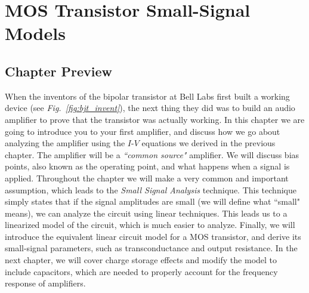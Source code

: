 \chapter{MOS Transistor Small-Signal Models}
\label{ch:ch09_mos_ss_dc}
\graphicspath{{./figs_mos_ss_dc/}}
\section{Chapter Preview}
When the inventors of the bipolar transistor at Bell Labs first built a working device (see \emph{Fig.~\ref{fig:bjt_invent}}), the next thing they did was to build an audio amplifier to prove that the transistor was actually working.  In this chapter we are going to introduce you to your first amplifier, and discuss how we go about analyzing the amplifier using the $I$-$V$ equations we derived in the previous chapter.  The amplifier will be a \emph{``common source"} amplifier.  We will discuss bias points, also known as the operating point, and what happens when a signal is applied.  Throughout the chapter we will make a very common and important assumption, which leads to the \emph{Small Signal Analysis} technique.  This technique simply states that if the signal amplitudes are small (we will define what ``small" means), we can analyze the circuit using linear techniques. This leads us to a linearized model of the circuit, which is much easier to analyze.  Finally, we will introduce the equivalent linear circuit model for a MOS transistor, and derive its small-signal parameters, such as transconductance and output resistance.  In the next chapter, we will cover charge storage effects and modify the model to include capacitors, which are needed to properly account for the frequency response of amplifiers.
